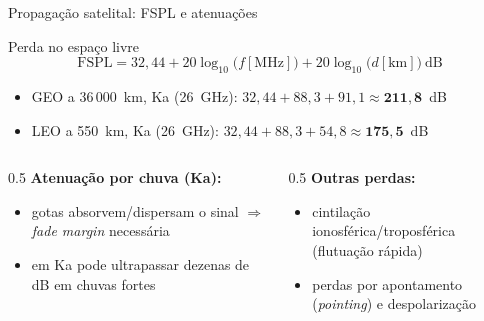 \documentclass[aspectratio=169,11pt]{beamer}
\begin{document}
\begin{frame}{Propagação satelital: FSPL e atenuações}
  \begin{block}{Perda no espaço livre}
    \[
      \text{FSPL} = 32{,}44 + 20\log_{10}\!\big(f[\text{MHz}]\big) + 20\log_{10}\!\big(d[\text{km}]\big)\ \text{dB}
    \]
    \begin{itemize}
      \item GEO a 36\,000~km, Ka (26~GHz): $32{,}44 + 88{,}3 + 91{,}1 \approx \mathbf{211{,}8}$~dB
      \item LEO a 550~km, Ka (26~GHz): $32{,}44 + 88{,}3 + 54{,}8 \approx \mathbf{175{,}5}$~dB
    \end{itemize}
  \end{block}
  \pause
  \begin{columns}
    \begin{column}{0.5\textwidth}
      \textbf{Atenuação por chuva (Ka):}
      \begin{itemize}
        \item gotas absorvem/dispersam o sinal $\Rightarrow$ \emph{fade margin} necessária
        \item em Ka pode ultrapassar dezenas de dB em chuvas fortes
      \end{itemize}
    \end{column}
    \begin{column}{0.5\textwidth}
      \textbf{Outras perdas:}
      \begin{itemize}
        \item cintilação ionosférica/troposférica (flutuação rápida)
        \item perdas por apontamento (\emph{pointing}) e despolarização
      \end{itemize}
    \end{column}
  \end{columns}
\end{frame}
\end{document}
